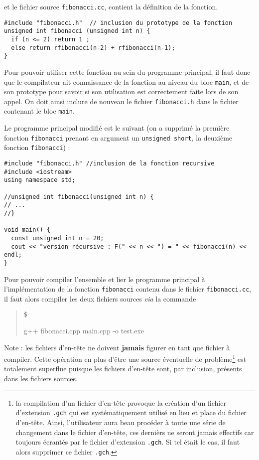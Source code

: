 \documentclass{book}
\newenvironment{prompt}{\begin{quote}\color{blue!75}\tt\$\,
}{\end{quote}}
\begin{document}
\begin{correction}
et le fichier source \texttt{fibonacci.cc}, contient la définition de la fonction.

\begin{verbatim}
#include "fibonacci.h"  // inclusion du prototype de la fonction
unsigned int fibonacci (unsigned int n) {
  if (n <= 2) return 1 ;
  else return rfibonacci(n-2) + rfibonacci(n-1);
}
\end{verbatim}

Pour pouvoir utiliser cette fonction au sein du programme principal, il faut
donc que le compilateur ait connaissance de la fonction au niveau du bloc \texttt{main}, et de son prototype pour savoir si son utilisation est correctement faite lors de son appel. On doit ainsi inclure de nouveau le fichier \texttt{fibonacci.h}
dans le fichier contenant le bloc \texttt{main}.

Le programme principal modifié est le suivant (on a supprimé la première fonction
\texttt{fibonacci} prenant en argument un \texttt{unsigned short}, la deuxième
fonction \texttt{fibonacci}) :

\begin{verbatim}
#include "fibonacci.h" //inclusion de la fonction recursive
#include <iostream>
using namespace std;

//unsigned int fibonacci(unsigned int n) {
// ...
//}

void main() {
  const unsigned int n = 20;
  cout << "version récursive : F(" << n << ") = " << fibonacci(n) << endl;
}
\end{verbatim}

Pour pouvoir compiler l'ensemble et lier le programme principal à
l'implémentation de la fonction \texttt{fibonacci} contenu dans le fichier \texttt{fibonacci.cc},
il faut alors compiler les deux fichiers sources \emph{via} la commande
\begin{prompt}
g++ fibonacci.cpp main.cpp -o test.exe
\end{prompt}
Note : les fichiers d'en-tête ne doivent \textbf{jamais} figurer en tant que fichier à
compiler. Cette opération en plus d'être une source éventuelle de problème\footnote{la compilation d'un fichier d'en-tête provoque la création d'un fichier d'extension \texttt{.gch} qui est systématiquement utilisé en lieu et place du fichier d'en-tête. Ainsi, l'utilisateur aura beau procéder à toute une série de changement dans le fichier d'en-tête, ces dernièrs ne seront jamais effectifs car toujours écrantés par le fichier d'extension \texttt{.gch}. Si tel était le cas, il faut alors supprimer ce fichier \texttt{.gch}.} est totalement superflue puisque les fichiers d'en-tête
sont, par inclusion, présents dans les fichiers sources.


\end{correction}
\end{document}
